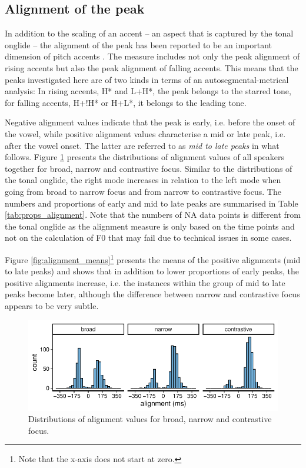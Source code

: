 \subsection{Alignment of the peak}

In addition to the scaling of an accent -- an aspect that is captured by the tonal onglide -- the alignment of the peak has been reported to be an important dimension of pitch accents \citep[see also Chapter \ref{chapter_prosody}]{Gussenhoven2004, Ladd2008, LaddMorton1997}. The measure includes not only the peak alignment of rising accents but also the peak alignment of falling accents. This means that the peaks investigated here are of two kinds in terms of an autosegmental-metrical analysis: In rising accents, H* and L+H*, the peak belongs to the starred tone, for falling accents, H+!H* or H+L*, it belongs to the leading tone.

Negative alignment values indicate that the peak is early, i.e. before the onset of the vowel, while positive alignment values characterise a mid or late peak, i.e. after the vowel onset. The latter are referred to as \emph{mid to late peaks} in what follows. Figure \ref{fig:alignment_distributions_within} presents the distributions of alignment values of all speakers together for broad, narrow and contrastive focus. Similar to the distributions of the tonal onglide, the right mode increases in relation to the left mode when going from broad to narrow focus and from narrow to contrastive focus. The numbers and proportions of early and mid to late peaks are summarised in Table \ref{tab:props_alignment}. Note that the numbers of NA data points is different from the tonal onglide as the alignment measure is only based on the time points and not on the calculation of F0 that may fail due to technical issues in some cases.

Figure \ref{fig:alignment_means}\footnote{Note that the x-axis does not start at zero.} presents the means of the positive alignments (mid to late peaks) and shows that in addition to lower proportions of early peaks, the positive alignments increase, i.e. the instances within the group of mid to late peaks become later, although the difference between narrow and contrastive focus appears to be very subtle.

\begin{figure}[p]
\includegraphics[width=.95\textwidth]{figures/ch6/alignment_distribution_within.pdf}
\caption{Distributions of alignment values for broad, narrow and contrastive focus.}
\label{fig:alignment_distributions_within}
\end{figure}



